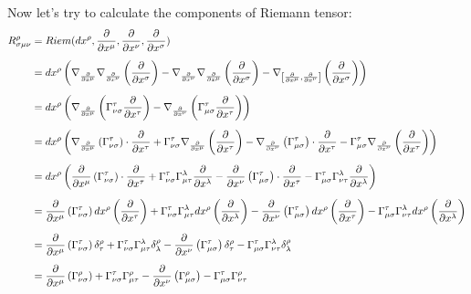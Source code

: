 Now let's try to calculate the components of Riemann tensor:
\begin{align*}
R^{\rho}_{\sigma \mu \nu} & = Riem(dx^{\rho},\frac{\partial }{\partial x^\mu}, \frac{\partial }{\partial x^\nu},\frac{\partial }{\partial x^\sigma}) \\[5pt]
&= dx^{\rho} \left(\nabla_{\frac{\partial }{\partial x^\mu}} \nabla_{\frac{\partial }{\partial x^ \nu}} \left(\frac{\partial }{\partial x^ \sigma}\right) -
\nabla_{\frac{\partial }{\partial x^ \nu}} \nabla_{\frac{\partial }{\partial x^ \mu}} \left (\frac{\partial }{\partial x^\sigma}\right) - \nabla_{\left[
\frac{\partial }{\partial x^\mu},\frac{\partial }{\partial x^\nu} \right]} \left(\frac{\partial }{\partial x^\sigma}\right) \right) \\[5pt]
&= dx^{\rho} \left(\nabla_{\frac{\partial }{\partial x^\mu}} \left( \Gamma^{\tau}_{\nu \sigma} \frac{\partial }{\partial x^\tau} \right) -
\nabla_{\frac{\partial }{\partial x^\nu}} \left( \Gamma^{\tau}_{\mu \sigma} \frac{\partial }{\partial x^\tau} \right) \right) \\[5pt]
&= dx^{\rho} \left( \nabla_{\frac{\partial }{\partial x^\mu}} \left( \Gamma^{\tau}_{\nu\sigma} \right) \cdot \frac{\partial }{\partial x^\tau} +
\Gamma^{\tau}_{\nu \sigma} \nabla_{\frac{\partial }{\partial x^\mu}} \left(\frac{\partial }{\partial x^\tau} \right) - \nabla_{\frac{\partial }{\partial x^\nu}}
\left( \Gamma^{\tau}_{\mu \sigma} \right) \cdot \frac{\partial }{\partial x^\tau} - \Gamma^{\tau}_{\mu \sigma}
\nabla_{\frac{\partial }{\partial x^\nu}} \left( \frac{\partial }{\partial x^\tau} \right) \right) \\[5pt]
&= dx^{\rho} \left( \frac{\partial }{\partial x^\mu} \left( \Gamma^{\tau}_{\nu \sigma}\right) \cdot \frac{\partial }{\partial x^\tau} +
\Gamma^{\tau}_{\nu \sigma} \Gamma^{\lambda}_{\mu \tau} \frac{\partial }{\partial x^\lambda} - \frac{\partial }{\partial x^\nu}
\left(\Gamma^{\tau}_{\mu \sigma} \right) \cdot \frac{\partial }{\partial x^\tau} - \Gamma^{\tau}_{\mu \sigma} \Gamma^{\lambda}_{\nu \tau}
\frac{\partial }{\partial x^\lambda} \right)\\[5pt]
&= \frac{\partial }{\partial x^\mu} \left( \Gamma^{\tau}_{\nu \sigma} \right) dx^{\rho} \left( \frac{\partial }{\partial x^\tau} \right)
+ \Gamma^{\tau}_{\nu \sigma} \Gamma^{\lambda}_{\mu \tau} dx^{\rho} \left (\frac{\partial }{\partial x^\lambda} \right) -
\frac{\partial }{\partial x^\nu} \left( \Gamma^{\tau}_{\mu \sigma} \right) dx^{\rho} \left( \frac{\partial }{\partial x^\tau} \right) -
\Gamma^{\tau}_{\mu \sigma} \Gamma^{\lambda}_{\nu \tau} dx^{\rho} \left(\frac{\partial }{\partial x^\lambda} \right)\\[5pt]
&= \frac{\partial }{\partial x^\mu} \left( \Gamma^{\tau}_{\nu \sigma} \right) \delta^{\rho}_{\tau} +\Gamma^{\tau}_{\nu \sigma}
\Gamma^{\lambda}_{\mu \tau} \delta^{\rho}_{\lambda}- \frac{\partial }{\partial x^\nu} \left( \Gamma^{\tau}_{\mu \sigma} \right)
\delta^{\rho}_{\tau} - \Gamma^{\tau}_{\mu \sigma} \Gamma^{\lambda}_{\nu \tau} \delta^{\rho}_{\lambda}\\[5pt]
&= \frac{\partial }{\partial x^\mu} \left( \Gamma^{\rho}_{\nu \sigma} \right) + \Gamma^{\tau}_{\nu \sigma} \Gamma^{\rho}_{\mu \tau}
- \frac{\partial }{\partial x^\nu} \left( \Gamma^{\rho}_{\mu \sigma} \right) - \Gamma^{\tau}_{\mu \sigma} \Gamma^{\rho}_{\nu \tau}
\end{align*}

